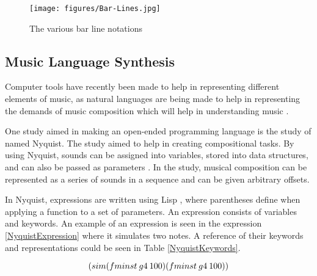 \begin{figure}[H]
    \centering
    \texttt{[image: figures/Bar-Lines.jpg]}
    \caption{The various bar line notations \protect\cite{Bar-Lines}}
    \label{fig:Bar-Lines}
\end{figure}

\subsection{Music Language Synthesis}
Computer tools have recently been made to help in representing different elements of music, as natural languages are being made to help in representing the demands of music composition which will help in understanding music \cite{loy1985programming}.
\newline

One study aimed in making an open-ended programming language is the study of  named Nyquist. The study aimed to help in creating compositional tasks. By using Nyquist, sounds can be assigned into variables, stored into data structures, and can also be passed as parameters \cite{dannenberg1997machine}. In the study, musical composition can be represented as a series of sounds in a sequence and can be given arbitrary offsets. 

In Nyquist, expressions are written using Lisp \cite{turetsky1984lisp}, where parentheses define when applying a function to a set of parameters. An expression consists of variables and keywords. An example of an expression is seen in the expression \ref{NyquistExpression} where it simulates two notes. A reference of their keywords and representations could be seen in Table \ref{NyquistKeywords}.

\begin{equation}
          (sim (fminst\: g4\: 100) \\
        (fminst\: g4\: 100))
    \label{NyquistExpression}
\end{equation}


